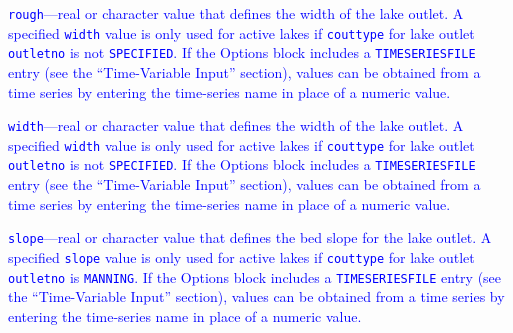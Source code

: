 \item \textcolor{blue}{\texttt{rough}---real or character value that defines the width of the lake outlet. A specified \texttt{width} value is only used for active lakes if \texttt{couttype} for lake outlet \texttt{outletno} is not \texttt{SPECIFIED}. If the Options block includes a \texttt{TIMESERIESFILE} entry (see the ``Time-Variable Input'' section), values can be obtained from a time series by entering the time-series name in place of a numeric value.}

\item \textcolor{blue}{\texttt{width}---real or character value that defines the width of the lake outlet. A specified \texttt{width} value is only used for active lakes if \texttt{couttype} for lake outlet \texttt{outletno} is not \texttt{SPECIFIED}. If the Options block includes a \texttt{TIMESERIESFILE} entry (see the ``Time-Variable Input'' section), values can be obtained from a time series by entering the time-series name in place of a numeric value.}

\item \textcolor{blue}{\texttt{slope}---real or character value that defines the bed slope for the lake outlet. A specified \texttt{slope} value is only used for active lakes if \texttt{couttype} for lake outlet \texttt{outletno} is \texttt{MANNING}. If the Options block includes a \texttt{TIMESERIESFILE} entry (see the ``Time-Variable Input'' section), values can be obtained from a time series by entering the time-series name in place of a numeric value.}


